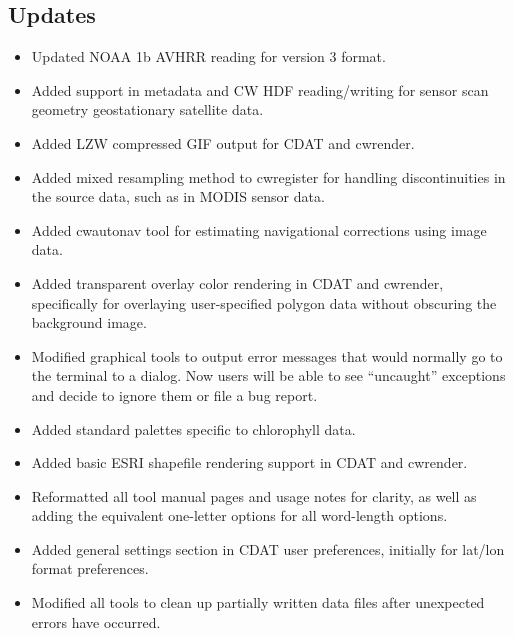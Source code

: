\subsection*{Updates}
\begin{itemize}

  \item Updated NOAA 1b AVHRR reading for version 3 format.

  \item Added support in metadata and CW HDF reading/writing for
  sensor scan geometry geostationary satellite data.

  \item Added LZW compressed GIF output for CDAT and cwrender.

  \item Added mixed resampling method to cwregister for handling
  discontinuities in the source data, such as in MODIS sensor data.

  \item Added cwautonav tool for estimating navigational corrections
  using image data.

  \item Added transparent overlay color rendering in CDAT and
  cwrender, specifically for overlaying user-specified polygon data
  without obscuring the background image.

  \item Modified graphical tools to output error messages that would
  normally go to the terminal to a dialog. Now users will be able to
  see ``uncaught'' exceptions and decide to ignore them or file a bug
  report.

  \item Added standard palettes specific to chlorophyll data.

  \item Added basic ESRI shapefile rendering support in CDAT and
  cwrender.

  \item Reformatted all tool manual pages and usage notes for clarity,
  as well as adding the equivalent one-letter options for all
  word-length options.

  \item Added general settings section in CDAT user preferences,
  initially for lat/lon format preferences.

  \item Modified all tools to clean up partially written data files
  after unexpected errors have occurred.


\end{itemize}
